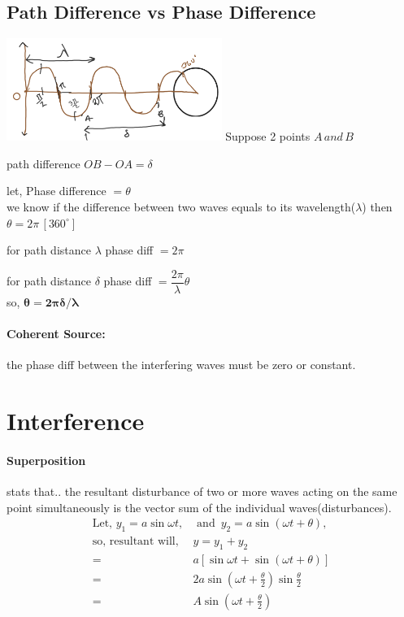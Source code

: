 \documentclass[legalpaper,10pt]{article}
\begin{document}
\begin{multicols*}{2}
		\subsection*{Path Difference vs Phase Difference}
		\includegraphics[width=7cm]{abc.png}
		Suppose 2 points $A\,and\,B$\par
		path difference $OB-OA=\delta$\par
		let, Phase difference $=\theta$\\
		we know if the difference between two waves equals to its wavelength($\lambda$) then $\theta=2\pi\,[360^{\circ}]$\par
		for path distance $\lambda$ phase diff $=2\pi$\par
		for path distance $\delta$ phase diff $=\dfrac{2\pi}{\lambda}\theta$\\
		\indent so, \(\mathbf{\boxed{\theta=2\pi\delta/\lambda }}\)
		
		\paragraph{Coherent Source:}the phase diff between the interfering waves must be zero or constant.
		
		\section*{Interference}
		\paragraph{Superposition}stats that.. the resultant disturbance of two or more waves acting on the same point simultaneously is the vector sum of the individual waves(disturbances).
		\begin{align*}
			\text{Let, }y_1=a\sin{\omega t}, & \text{ and } \,y_2=a\sin{(\omega t+\theta)}, \\
			\text{so, resultant will, }      & y=y_1+y_2
			\\= &a[\sin{\omega t}+\sin{(\omega t+\theta)}]
			\\= &2a \sin{(\omega t+\frac{\theta}{2}) \sin{\frac{\theta}{2}}}
			\\= &A \sin{(\omega t+\frac{\theta}{2})}
		\end{align*}

\end{multicols*}
\end{document}
